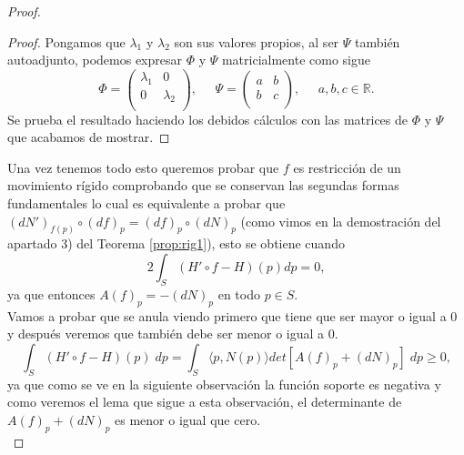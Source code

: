 \begin{proof}
\begin{proof}
		Pongamos que $\lambda_1$ y $\lambda_2$ son sus valores propios, al ser $\Psi$ también autoadjunto, podemos expresar $\Phi$ y $\Psi$ matricialmente como sigue
		${ }$\\
		\[
			\Phi = \left( {\begin{array}{cc}
				\lambda_1 & 0 \\
				0 & \lambda_2 \\
				\end{array} } \right),
			\;\;\;\;\;
			\Psi = \left( {\begin{array}{cc}
				a & b \\
				b & c \\
				\end{array} } \right), \;\;\;\;\; a, b,c \in \mathbb{R}.
		\]
		${ }$\\
		
		Se prueba el resultado haciendo los debidos cálculos con las matrices de $\Phi$ y $\Psi$ que acabamos de mostrar.
	\end{proof}
	${ }$\\
	
	Una vez tenemos todo esto queremos probar que $f$ es restricción de un movimiento rígido comprobando que se conservan las segundas formas fundamentales lo cual es equivalente a probar que $(dN')_{f(p)} \circ (df)_p = (df)_p \circ (dN)_p$ (como vimos en la demostración del apartado 3) del Teorema \ref{prop:rig1}), esto se obtiene cuando
	${ }$\\
	\[
		2\int_S (H' \circ f - H)(p) dp = 0,
	\]
	${ }$\\
	ya que entonces $A(f)_p = -(dN)_p$ en todo $p \in S$.
	${ }$\\
	
	Vamos a probar que se anula viendo primero que tiene que ser mayor o igual a 0 y después veremos que también debe ser menor o igual a 0.
	${ }$\\
	\[
		\int_S (H' \circ f - H)(p) \; dp = \int_S \langle p, N(p) \rangle det[A(f)_p + (dN)_p] \; dp \geq 0,
	\]
	${ }$\\
	ya que como se ve en la siguiente observación la función soporte es negativa y como veremos el lema que sigue a esta observación, el determinante de $A(f)_p + (dN)_p$ es menor o igual que cero. 
${ }$\\


\end{proof}
